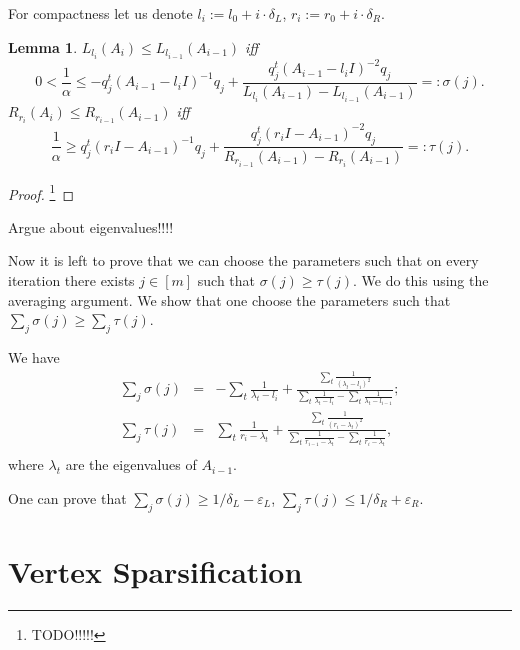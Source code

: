 \documentclass[12pt]{article}
\newcommand{\eps}{\varepsilon}
\newtheorem{lemma}{Lemma}
\begin{document}
    For compactness let us denote $l_i := l_0 + i \cdot \delta_L$,
    $r_i := r_0 + i \cdot \delta_R$.

    \begin{lemma}
      $L_{l_i}(A_i) \leq L_{l_{i-1}}(A_{i-1})$
      iff
      $$
        0 < \frac{1}{\alpha} \leq -q_j^t (A_{i-1} - l_i I)^{-1} q_j +
        \frac{q_j^t (A_{i-1} - l_i I)^{-2}q_j}{L_{l_i}(A_{i-1}) - L_{l_{i-1}}(A_{i-1})}
        =: \sigma(j).
      $$
      $R_{r_i}(A_i) \leq R_{r_{i-1}}(A_{i-1})$ iff
      $$
        \frac{1}{\alpha} \geq q_j^t (r_i I - A_{i-1})^{-1} q_j +
        \frac{q_j^t (r_i I - A_{i-1})^{-2} q_j}{R_{r_{i-1}}(A_{i-1}) - R_{r_i}(A_{i-1})}
        =: \tau(j). 
      $$
    \end{lemma}
    \begin{proof}
        \footnote{TODO!!!!!}
    \end{proof}

    Argue about eigenvalues!!!!
    
    Now it is left to prove that we can choose the parameters such that on every 
    iteration there exists
    $j \in [m]$ such that $\sigma(j) \geq \tau(j)$.
    We do this using the averaging argument. We show that one choose the parameters such
    that $\sum_j \sigma(j) \geq \sum_j \tau(j)$.

    We have
    \begin{eqnarray*}
        \sum_j \sigma(j) &=& -\sum_t \frac{1}{\lambda_t - l_i} +
        \frac{\sum_t \frac{1}{(\lambda_t - l_i)^2}}
        {\sum_t \frac{1}{\lambda_t - l_i} - \sum_t \frac{1}{\lambda_t - l_{i-1}}};\\ 
        \sum_j \tau(j) &=& \sum_t \frac{1}{r_i - \lambda_t} +
        \frac{\sum_t \frac{1}{(r_i - \lambda_t)^2}}
        {\sum_t \frac{1}{r_{i-1} - \lambda_t} - \sum_t \frac{1}{r_i - \lambda_t}},\\ 
    \end{eqnarray*}
    where $\lambda_t$ are the eigenvalues of $A_{i-1}$.

    One can prove that $\sum_j \sigma(j) \geq 1 / \delta_L - \eps_L$,
    $\sum_j \tau(j) \leq 1 / \delta_R + \eps_R$.

    \section{Vertex Sparsification}
    
    
\end{document}
